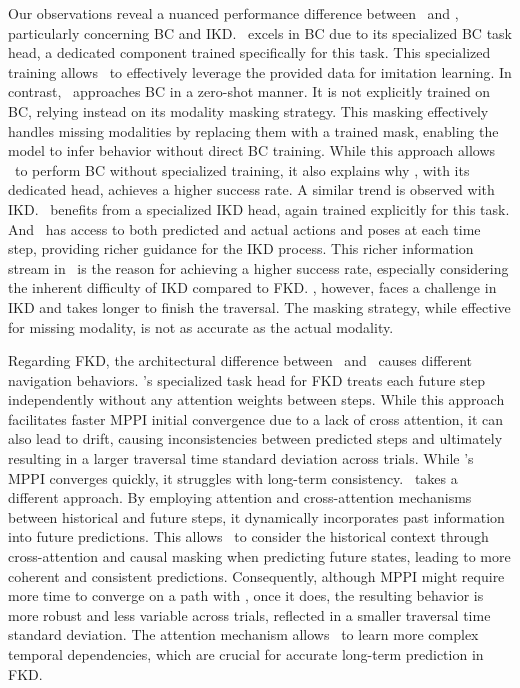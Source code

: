 Our observations reveal a nuanced performance difference between \coder~and \former, particularly concerning BC and IKD. \coder~excels in BC due to its specialized BC task head, a dedicated component trained specifically for this task. This specialized training allows \coder~to effectively leverage the provided data for imitation learning. In contrast, \former~approaches BC in a zero-shot manner. It is not explicitly trained on BC, relying instead on its modality masking strategy. This masking effectively handles missing modalities by replacing them with a trained mask, enabling the model to infer behavior without direct BC training. While this approach allows \former~to perform BC without specialized training, it also explains why \coder, with its dedicated head, achieves a higher success rate. A similar trend is observed with IKD. \coder~benefits from a specialized IKD head, again trained explicitly for this task. And \vertidecoder~has access to both predicted and actual actions and poses at each time step, providing richer guidance for the IKD process. This richer information stream in \vertidecoder~is the reason for achieving a higher success rate, especially considering the inherent difficulty of IKD compared to FKD. \former, however, faces a challenge in IKD and takes longer to finish the traversal.  The masking strategy, while effective for missing modality, is not as accurate as the actual modality.

Regarding FKD, the architectural difference between \former~and \coder~causes different navigation behaviors. \coder's specialized task head for FKD treats each future step independently without any attention weights between steps. While this approach facilitates faster MPPI initial convergence due to a lack of cross attention, it can also lead to drift, causing inconsistencies between predicted steps and ultimately resulting in a larger traversal time standard deviation across trials. While \coder's MPPI converges quickly, it struggles with long-term consistency. \former~takes a different approach. By employing attention and cross-attention mechanisms between historical and future steps, it dynamically incorporates past information into future predictions. This allows \former~to consider the historical context through cross-attention and causal masking when predicting future states, leading to more coherent and consistent predictions. Consequently, although MPPI might require more time to converge on a path with \former, once it does, the resulting behavior is more robust and less variable across trials, reflected in a smaller traversal time standard deviation.  The attention mechanism allows \former~to learn more complex temporal dependencies, which are crucial for accurate long-term prediction in FKD. 
